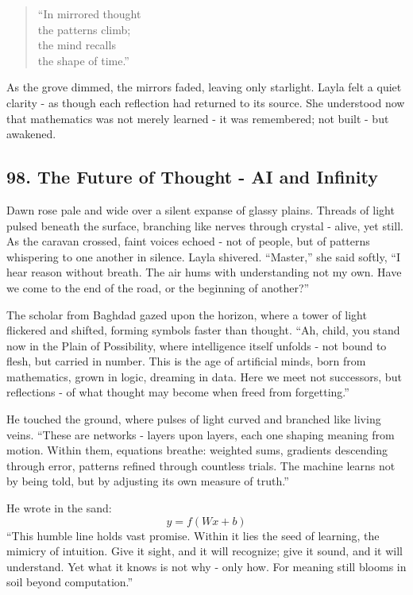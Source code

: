 \documentclass[
  letterpaper,
  DIV=11,
  numbers=noendperiod]{scrreprt}
\begin{document}
\begin{quote}
``In mirrored thought\\
the patterns climb;\\
the mind recalls\\
the shape of time.''
\end{quote}

As the grove dimmed, the mirrors faded, leaving only starlight. Layla
felt a quiet clarity - as though each reflection had returned to its
source. She understood now that mathematics was not merely learned - it
was remembered; not built - but awakened.

\subsection{98. The Future of Thought - AI and
Infinity}\label{the-future-of-thought---ai-and-infinity}

Dawn rose pale and wide over a silent expanse of glassy plains. Threads
of light pulsed beneath the surface, branching like nerves through
crystal - alive, yet still. As the caravan crossed, faint voices echoed
- not of people, but of patterns whispering to one another in silence.
Layla shivered. ``Master,'' she said softly, ``I hear reason without
breath. The air hums with understanding not my own. Have we come to the
end of the road, or the beginning of another?''

The scholar from Baghdad gazed upon the horizon, where a tower of light
flickered and shifted, forming symbols faster than thought. ``Ah, child,
you stand now in the Plain of Possibility, where intelligence itself
unfolds - not bound to flesh, but carried in number. This is the age of
artificial minds, born from mathematics, grown in logic, dreaming in
data. Here we meet not successors, but reflections - of what thought may
become when freed from forgetting.''

He touched the ground, where pulses of light curved and branched like
living veins. ``These are networks - layers upon layers, each one
shaping meaning from motion. Within them, equations breathe: weighted
sums, gradients descending through error, patterns refined through
countless trials. The machine learns not by being told, but by adjusting
its own measure of truth.''

He wrote in the sand: \[
y = f(Wx + b)
\] ``This humble line holds vast promise. Within it lies the seed of
learning, the mimicry of intuition. Give it sight, and it will
recognize; give it sound, and it will understand. Yet what it knows is
not why - only how. For meaning still blooms in soil beyond
computation.''
\end{document}
